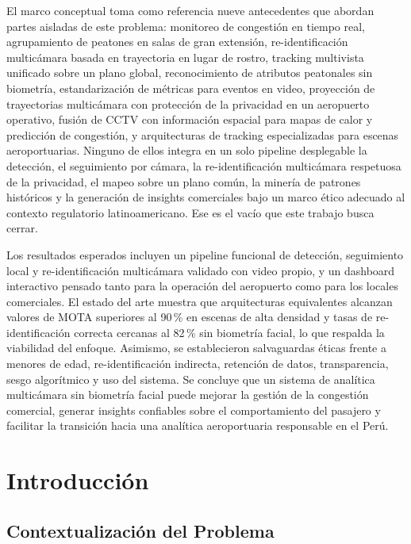 \documentclass[12pt,letterpaper]{article}
\begin{document}
El marco conceptual toma como referencia nueve antecedentes que abordan
partes aisladas de este problema: monitoreo de congestión en tiempo real,
agrupamiento de peatones en salas de gran extensión, re-identificación
multicámara basada en trayectoria en lugar de rostro, tracking multivista
unificado sobre un plano global, reconocimiento de atributos peatonales
sin biometría, estandarización de métricas para eventos en video,
proyección de trayectorias multicámara con protección de la privacidad en
un aeropuerto operativo, fusión de CCTV con información espacial para
mapas de calor y predicción de congestión, y arquitecturas de tracking
especializadas para escenas aeroportuarias. Ninguno de ellos integra en
un solo pipeline desplegable la detección, el seguimiento por cámara, la
re-identificación multicámara respetuosa de la privacidad, el mapeo sobre
un plano común, la minería de patrones históricos y la generación de
insights comerciales bajo un marco ético adecuado al contexto regulatorio
latinoamericano. Ese es el vacío que este trabajo busca cerrar.

Los resultados esperados incluyen un pipeline funcional de detección,
seguimiento local y re-identificación multicámara validado con video
propio, y un dashboard interactivo pensado tanto para la operación del
aeropuerto como para los locales comerciales. El estado del arte muestra
que arquitecturas equivalentes alcanzan valores de MOTA superiores al
90\,\% en escenas de alta densidad y tasas de re-identificación correcta
cercanas al 82\,\% sin biometría facial, lo que respalda la viabilidad
del enfoque. Asimismo, se establecieron salvaguardas éticas frente a
menores de edad, re-identificación indirecta, retención de datos,
transparencia, sesgo algorítmico y uso del sistema. Se concluye que un
sistema de analítica multicámara sin biometría facial puede mejorar la
gestión de la congestión comercial, generar insights confiables sobre el
comportamiento del pasajero y facilitar la transición hacia una analítica
aeroportuaria responsable en el Perú.


\section{Introducción}

\subsection{Contextualización del Problema}
\end{document}
